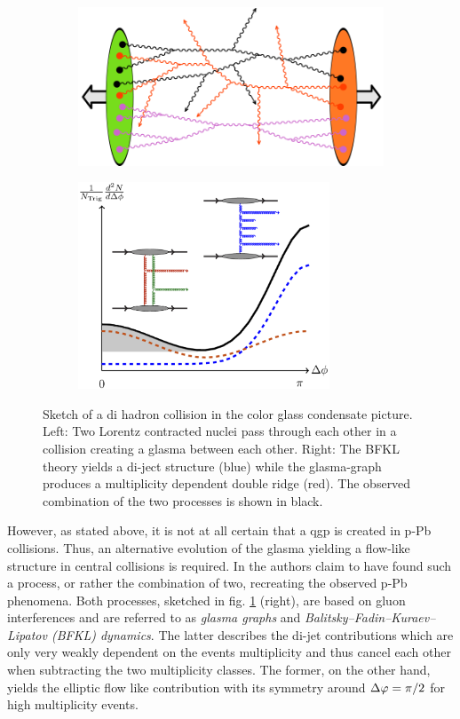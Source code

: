 \begin{figure}
  \centering
  \begin{subfigure}[m]{0.5\textwidth}
    \includegraphics[width=\textwidth]{figures/glasma.png}
  \end{subfigure}%
  \begin{subfigure}[m]{0.5\textwidth}
  \includegraphics[width=2.95in]{figures/cgc_sketch.png}
  \end{subfigure}
  \caption[Sketch of a di hadron collision in the color glass condensate picture.]{Sketch of a di hadron collision in the color glass condensate picture. Left: Two Lorentz contracted nuclei pass through each other in a collision creating a glasma between each other. Right: The BFKL theory yields a di-ject structure (blue) while the glasma-graph produces a multiplicity dependent double ridge (red). The observed combination of the two processes is shown in black.}
  \label{fig:cgc_sketch}
\end{figure}

However, as stated above, it is not at all certain that a \gls{qgp} is created in p-Pb collisions. Thus, an alternative evolution of the glasma yielding a flow-like structure in central collisions is required. In \cite{Dusling2013} the authors claim to have found such a process, or rather the combination of two, recreating the observed p-Pb phenomena. Both processes, sketched in fig. \ref{fig:cgc_sketch} (right), are based on gluon interferences and are referred to as \emph{glasma graphs} and \emph{Balitsky–Fadin–Kuraev–Lipatov (BFKL) dynamics}. The latter describes the di-jet contributions which are only very weakly dependent on the events multiplicity and thus cancel each other when subtracting the two multiplicity classes. The former, on the other hand, yields the elliptic flow like contribution with its symmetry around $\Delta\varphi = \pi / 2$ for high multiplicity events.

